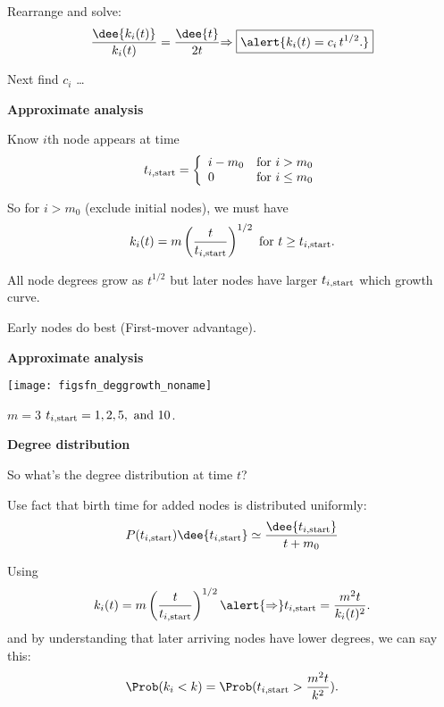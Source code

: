 \begin{frame}[label=]
\begin{frame}[label=]
\begin{frame}[label=]
\begin{frame}[label=]
\begin{frame}[label=]
\begin{frame}[label=]
\begin{frame}[label=]
   Rearrange and solve:
   $$
   \frac{\dee{k_{i}(t)}}
   {k_{i}(t)}
   =
   \frac{\dee{t}}
   {2t}
   {
     \Rightarrow
     \boxed{\alert{k_i(t) = c_i \,  t^{1/2}.}}
   }
   $$
 
   Next find $c_i$ \ldots
 


\begin{frame}[label=]
 \textbf{Approximate analysis}  

 
 
   Know $i$th node appears at time 
   $$
   t_{i,\textnormal{start}} = \left\{
     \begin{array}{ll}
       i-m_0 & \mbox{for $i>m_0$} \\
       0 & \mbox{for $i \le m_0$}
     \end{array}
   \right.
   $$
 
   So for $i>m_0$ (exclude initial nodes),
   we must have
   $$
   k_i(t) 
   = 
   m 
   \left(
   \frac{t}{t_{i,\textnormal{start}}}
   \right)^{1/2}
   \
   \mbox{for $t \ge t_{i,\textnormal{start}}$}.
   $$
  
   All node degrees grow as \alert{$t^{1/2}$}
   {but
   later nodes have larger $t_{i,\textnormal{start}}$ which
    growth curve.}
  
   Early nodes do \alert{best} (First-mover advantage).
 
 

\begin{frame}[label=]
 \textbf{Approximate analysis}  

    
   \texttt{[image: figsfn\_deggrowth\_noname]}
   
   
    $m = 3$
    $t_{i,\textnormal{start}} = 1, 2, 5, \mbox{\ and\ } 10$.
   
 

\begin{frame}[label=]
 \textbf{Degree distribution}
 
 
  
   So what's the \alert{degree distribution} at time $t$?
  
   Use fact that birth time for added nodes
   is distributed uniformly:
   $$
   P(t_{i,\textnormal{start}}) \dee{t_{i,\textnormal{start}}}
   \simeq
   \frac{\dee{t_{i,\textnormal{start}}}}
   {t+m_0}
   $$
 
   Using
   $$
   k_i(t) 
   = 
   m 
   \left(
   \frac{t}{t_{i,\textnormal{start}}}
   \right)^{1/2}
   \alert{\Rightarrow}
   t_{i,\textnormal{start}}
   = \frac{m^2 t}{k_i(t)^2}.
   $$
   {
     and by understanding that later arriving nodes have lower degrees,
     we can say this:
     $$
     \Prob(k_i < k)
     =
     \Prob(t_{i,\textnormal{start}} > \frac{m^2 t}{k^2}).
     $$
   }


\end{frame}
\end{frame}
\end{frame}
\end{frame}
\end{frame}
\end{frame}
\end{frame}
\end{frame}
\end{frame}
\end{frame}
